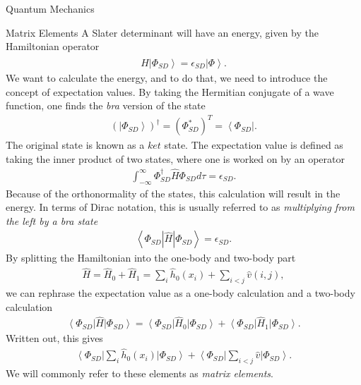 \documentclass[twoside,english]{uiofysmaster}
\begin{document}
\begin{chapter}{Quantum Mechanics}
	\begin{section}{Matrix Elements}
		A Slater determinant will have an energy, given by the Hamiltonian operator
		\begin{align}
			\hat H \left| \Phi_{SD} \right> = \epsilon_{SD} \left| \Phi \right>.
		\end{align}
		We want to calculate the energy, and to do that, we need to introduce the concept of expectation values. By taking the Hermitian conjugate of a wave function, one finds the \textit{bra} version of the state 
		\begin{align}
			\left( \left| \Phi_{SD} \right> \right)^\dagger = \left( \Phi_{SD}^* \right)^T = \left< \Phi_{SD} \right|.
		\end{align}
		The original state is known as a $ket$ state. The expectation value is defined as taking the inner product of two states, where one is worked on by an operator
		\begin{align}
			\int_{-\infty}^\infty \Phi_{SD}^\dagger \hat H \Phi_{SD} d \tau = \epsilon_{SD}.
		\end{align}
		Because of the orthonormality of the states, this calculation will result in the energy. In terms of Dirac notation, this is usually referred to as \textit{multiplying from the left by a bra state}
		\begin{align}
			\left< \right. \Phi_{SD} | \hat H | \Phi_{SD} \left. \right> = \epsilon_{SD}.
		\end{align}
		By splitting the Hamiltonian into the one-body and two-body part
		\begin{align}
			\hat H = \hat H_0 + \hat H_1 = \sum_i \hat h_0(x_i) + \sum_{i<j} \hat v(i,j),
		\end{align}
		we can rephrase the expectation value as a one-body calculation and a two-body calculation 
		\begin{align}
			\left< \Phi_{SD} \right| \hat H \left| \Phi_{SD} \right> = \left< \Phi_{SD} \right| \hat H_0 \left| \Phi_{SD} \right> + \left< \Phi_{SD} \right| \hat H_1 \left| \Phi_{SD} \right>.
		\end{align}
		Written out, this gives 
		\begin{align}
			\left< \Phi_{SD} \right| \sum_i \hat h_0(x_i) \left| \Phi_{SD} \right> + \left< \Phi_{SD} \right| \sum_{i<j} \hat v \left| \Phi_{SD} \right>.
		\end{align}
		We will commonly refer to these elements as \textit{matrix elements}.


\end{section}
\end{chapter}
\end{document}
